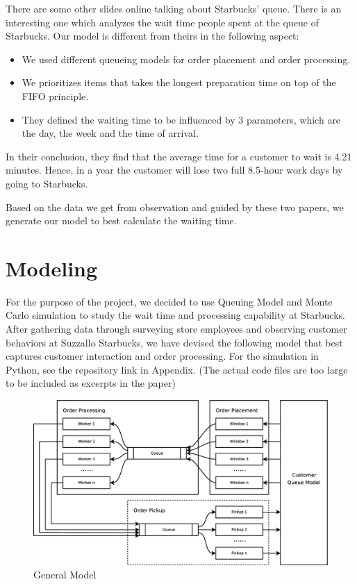\documentclass[a4paper]{article}
\begin{document}
There are some other slides online talking about Starbucks' queue.\cite{timing} There is an interesting one which analyzes the wait time people spent at the queue of Starbucks. Our model is different from theirs in the following aspect: 
\begin{itemize}
\item We used different queueing models for order placement and order processing.

\item We prioritizes items that takes the longest preparation time on top of the FIFO principle. 

\item They defined the waiting time to be influenced by 3 parameters, which are the day, the week and the time of arrival. 
\end{itemize}
In their conclusion, they find that the average time for a customer to wait is 4.21 minutes. Hence, in a year the customer will lose two full 8.5-hour work days by going to Starbucks. 

Based on the data we get from observation and guided by these two papers, we generate our model to best calculate the waiting time. 

\newpage
\section{Modeling}

For the purpose of the project, we decided to use Queuing Model and Monte Carlo simulation to study the wait time and processing capability at Starbucks. After gathering data through surveying store employees and observing customer behaviors at Suzzallo Starbucks, we have devised the following model that best captures customer interaction and order processing. For the simulation in Python, see the repository link in Appendix. (The actual code files are too large to be included as excerpts in the paper)

\begin{figure}[H]
	\centering
	\includegraphics[width=0.60\textheight]{GeneralModel}
	\caption{General Model}
\end{figure}
\end{document}
